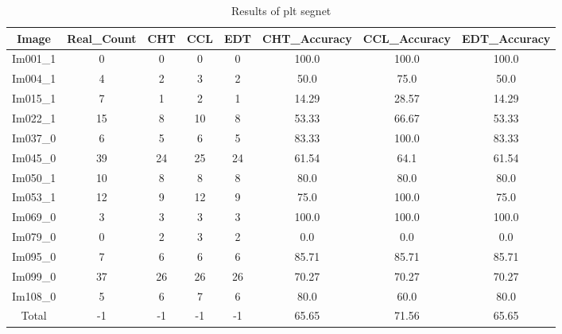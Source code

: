 \begin{table}[H]
\centering
\begin{tabular}{|c|c|c|c|c|c|c|c|}
\hline
 \textbf{Image} & \textbf{Real\_Count} & \textbf{CHT} & \textbf{CCL} & \textbf{EDT} & \textbf{CHT\_Accuracy} & \textbf{CCL\_Accuracy} & \textbf{EDT\_Accuracy} \\ \hline
 Im001\_1 & 0 & 0 & 0 & 0 & 100.0 & 100.0 & 100.0 \\ 
 Im004\_1 & 4 & 2 & 3 & 2 & 50.0 & 75.0 & 50.0 \\ 
 Im015\_1 & 7 & 1 & 2 & 1 & 14.29 & 28.57 & 14.29 \\ 
 Im022\_1 & 15 & 8 & 10 & 8 & 53.33 & 66.67 & 53.33 \\ 
 Im037\_0 & 6 & 5 & 6 & 5 & 83.33 & 100.0 & 83.33 \\ 
 Im045\_0 & 39 & 24 & 25 & 24 & 61.54 & 64.1 & 61.54 \\ 
 Im050\_1 & 10 & 8 & 8 & 8 & 80.0 & 80.0 & 80.0 \\ 
 Im053\_1 & 12 & 9 & 12 & 9 & 75.0 & 100.0 & 75.0 \\ 
 Im069\_0 & 3 & 3 & 3 & 3 & 100.0 & 100.0 & 100.0 \\ 
 Im079\_0 & 0 & 2 & 3 & 2 & 0.0 & 0.0 & 0.0 \\ 
 Im095\_0 & 7 & 6 & 6 & 6 & 85.71 & 85.71 & 85.71 \\ 
 Im099\_0 & 37 & 26 & 26 & 26 & 70.27 & 70.27 & 70.27 \\ 
 Im108\_0 & 5 & 6 & 7 & 6 & 80.0 & 60.0 & 80.0 \\ \hline
 Total & -1 & -1 & -1 & -1 & 65.65 & 71.56 & 65.65 \\ 

\hline
\end{tabular}
\caption{Results of plt segnet}
\label{Results of plt segnet}
\end{table}
